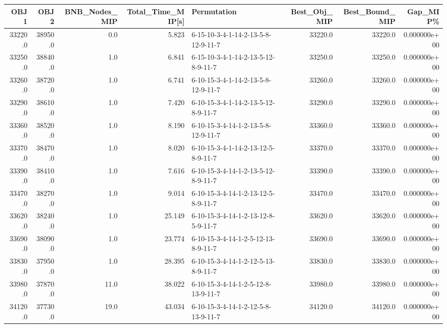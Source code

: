 \begin{tabular}{rrrrlrrr}
\toprule
    OBJ1 &     OBJ2 &  BNB\_Nodes\_MIP &  Total\_Time\_MIP[s] &                          Permutation &  Best\_Obj\_MIP &  Best\_Bound\_MIP &      Gap\_MIP\% \\
\midrule
 33220.0 &  38950.0 &            0.0 &              5.823 &  6-15-10-3-4-1-14-2-13-5-8-12-9-11-7 &       33220.0 &         33220.0 &  0.000000e+00 \\
 33250.0 &  38840.0 &            1.0 &              6.841 &  6-15-10-3-4-1-14-2-13-5-12-8-9-11-7 &       33250.0 &         33250.0 &  0.000000e+00 \\
 33260.0 &  38720.0 &            1.0 &              6.741 &  6-10-15-3-4-1-14-2-13-5-8-12-9-11-7 &       33260.0 &         33260.0 &  0.000000e+00 \\
 33290.0 &  38610.0 &            1.0 &              7.420 &  6-10-15-3-4-1-14-2-13-5-12-8-9-11-7 &       33290.0 &         33290.0 &  0.000000e+00 \\
 33360.0 &  38520.0 &            1.0 &              8.190 &  6-10-15-3-4-14-1-2-13-5-8-12-9-11-7 &       33360.0 &         33360.0 &  0.000000e+00 \\
 33370.0 &  38470.0 &            1.0 &              8.020 &  6-10-15-3-4-1-14-2-13-12-5-8-9-11-7 &       33370.0 &         33370.0 &  0.000000e+00 \\
 33390.0 &  38410.0 &            1.0 &              7.616 &  6-10-15-3-4-14-1-2-13-5-12-8-9-11-7 &       33390.0 &         33390.0 &  0.000000e+00 \\
 33470.0 &  38270.0 &            1.0 &              9.014 &  6-10-15-3-4-14-1-2-13-12-5-8-9-11-7 &       33470.0 &         33470.0 &  0.000000e+00 \\
 33620.0 &  38240.0 &            1.0 &             25.149 &  6-10-15-3-4-14-1-2-13-12-8-5-9-11-7 &       33620.0 &         33620.0 &  0.000000e+00 \\
 33690.0 &  38090.0 &            1.0 &             23.774 &  6-10-15-3-4-14-1-2-5-12-13-8-9-11-7 &       33690.0 &         33690.0 &  0.000000e+00 \\
 33830.0 &  37950.0 &            1.0 &             28.395 &  6-10-15-3-4-14-1-2-12-5-13-8-9-11-7 &       33830.0 &         33830.0 &  0.000000e+00 \\
 33980.0 &  37870.0 &           11.0 &             38.022 &  6-10-15-3-4-14-1-2-5-12-8-13-9-11-7 &       33980.0 &         33980.0 &  0.000000e+00 \\
 34120.0 &  37730.0 &           19.0 &             43.034 &  6-10-15-3-4-14-1-2-12-5-8-13-9-11-7 &       34120.0 &         34120.0 &  0.000000e+00 \\

\end{tabular}
